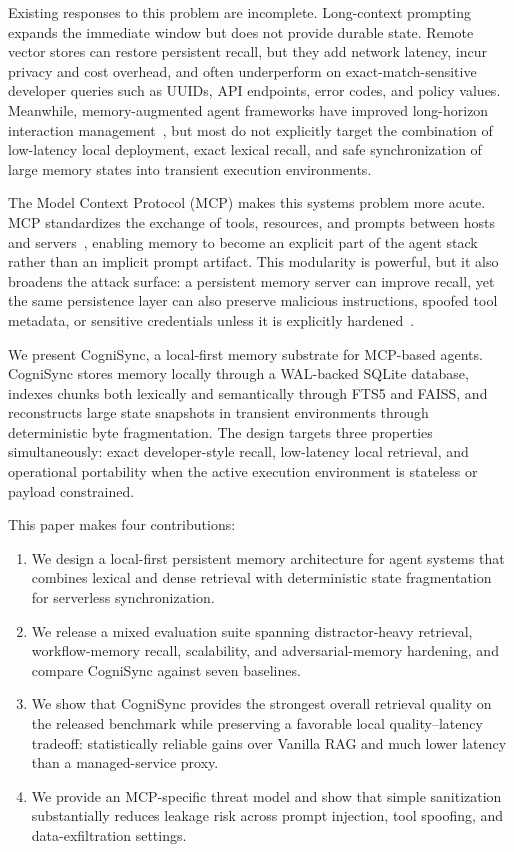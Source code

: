 \documentclass{article}
\begin{document}
Existing responses to this problem are incomplete. Long-context prompting expands the immediate window but does not provide durable state. Remote vector stores can restore persistent recall, but they add network latency, incur privacy and cost overhead, and often underperform on exact-match-sensitive developer queries such as UUIDs, API endpoints, error codes, and policy values. Meanwhile, memory-augmented agent frameworks have improved long-horizon interaction management~\cite{memorybank,memgpt,amem}, but most do not explicitly target the combination of low-latency local deployment, exact lexical recall, and safe synchronization of large memory states into transient execution environments.

The Model Context Protocol (MCP) makes this systems problem more acute. MCP standardizes the exchange of tools, resources, and prompts between hosts and servers~\cite{mcp-spec}, enabling memory to become an explicit part of the agent stack rather than an implicit prompt artifact. This modularity is powerful, but it also broadens the attack surface: a persistent memory server can improve recall, yet the same persistence layer can also preserve malicious instructions, spoofed tool metadata, or sensitive credentials unless it is explicitly hardened~\cite{mcp-security,mcpsecbench}.

We present CogniSync, a local-first memory substrate for MCP-based agents. CogniSync stores memory locally through a WAL-backed SQLite database, indexes chunks both lexically and semantically through FTS5 and FAISS, and reconstructs large state snapshots in transient environments through deterministic byte fragmentation. The design targets three properties simultaneously: exact developer-style recall, low-latency local retrieval, and operational portability when the active execution environment is stateless or payload constrained.

This paper makes four contributions:
\begin{enumerate}
    \item We design a local-first persistent memory architecture for agent systems that combines lexical and dense retrieval with deterministic state fragmentation for serverless synchronization.
    \item We release a mixed evaluation suite spanning distractor-heavy retrieval, workflow-memory recall, scalability, and adversarial-memory hardening, and compare CogniSync against seven baselines.
    \item We show that CogniSync provides the strongest overall retrieval quality on the released benchmark while preserving a favorable local quality--latency tradeoff: statistically reliable gains over Vanilla RAG and much lower latency than a managed-service proxy.
    \item We provide an MCP-specific threat model and show that simple sanitization substantially reduces leakage risk across prompt injection, tool spoofing, and data-exfiltration settings.
\end{enumerate}
\end{document}
